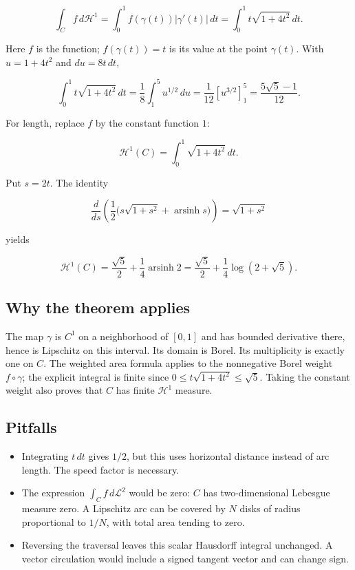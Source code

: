 \documentclass[
  11pt,
]{article}
\providecommand{\tightlist}{%
  \setlength{\itemsep}{0pt}\setlength{\parskip}{0pt}}
\begin{document}
\[
\int_C f\,d\mathcal H^1
=\int_0^1 f(\gamma(t))|\gamma'(t)|\,dt
=\int_0^1 t\sqrt{1+4t^2}\,dt.
\]

Here \(f\) is the function; \(f(\gamma(t))=t\) is its value at the point
\(\gamma(t)\). With \(u=1+4t^2\) and \(du=8t\,dt\),

\[
\int_0^1 t\sqrt{1+4t^2}\,dt
=\frac18\int_1^5 u^{1/2}\,du
=\frac1{12}[u^{3/2}]_1^5
=\boxed{\frac{5\sqrt5-1}{12}}.
\]

For length, replace \(f\) by the constant function \(1\):

\[
\mathcal H^1(C)=\int_0^1\sqrt{1+4t^2}\,dt.
\]

Put \(s=2t\). The identity

\[
\frac{d}{ds}\left(\frac12\bigl(s\sqrt{1+s^2}+\operatorname{arsinh}s\bigr)\right)
=\sqrt{1+s^2}
\]

yields

\[
\mathcal H^1(C)
=\frac{\sqrt5}{2}+\frac14\operatorname{arsinh}2
=\boxed{\frac{\sqrt5}{2}+\frac14\log(2+\sqrt5)}.
\]

\subsection{Why the theorem applies}\label{why-the-theorem-applies-6}

The map \(\gamma\) is \(C^1\) on a neighborhood of \([0,1]\) and has
bounded derivative there, hence is Lipschitz on this interval. Its
domain is Borel. Its multiplicity is exactly one on \(C\). The weighted
area formula applies to the nonnegative Borel weight \(f\circ\gamma\);
the explicit integral is finite since
\(0\leq t\sqrt{1+4t^2}\leq\sqrt5\). Taking the constant weight also
proves that \(C\) has finite \(\mathcal H^1\) measure.

\subsection{Pitfalls}\label{pitfalls-6}

\begin{itemize}
\tightlist
\item
  Integrating \(t\,dt\) gives \(1/2\), but this uses horizontal distance
  instead of arc length. The speed factor is necessary.
\item
  The expression \(\int_C f\,d\mathcal L^2\) would be zero: \(C\) has
  two-dimensional Lebesgue measure zero. A Lipschitz arc can be covered
  by \(N\) disks of radius proportional to \(1/N\), with total area
  tending to zero.
\item
  Reversing the traversal leaves this scalar Hausdorff integral
  unchanged. A vector circulation would include a signed tangent vector
  and can change sign.
\end{itemize}
\end{document}
